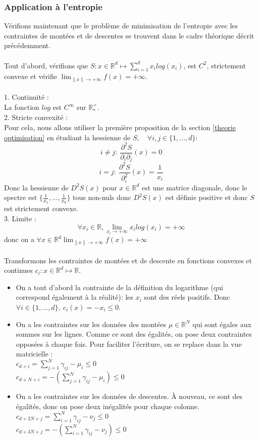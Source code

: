 \documentclass[12pt]{article}
\newcommand{\R}{\mathbb{R}}
\newcommand{\Rd}{\mathbb{R}^d}
\begin{document}
\subsubsection{Application à l'entropie}
Vérifions maintenant que le problème de minimisation de l'entropie avec les contraintes de montées et de descentes se trouvent dans le cadre théorique décrit précédemment.\\
\\
Tout d'abord, vérifions que $S : x \in \Rd \mapsto \sum_{i=1}^dx_ilog(x_i)$, est $C^2$, strictement convexe et vérifie $\lim_{\lVert x\lVert \to +\infty} f(x) = +\infty$.\\
\\
1. Continuité :\\
La fonction $log$ est $C^{\infty}$ sur $\R^+_*$.\\
2. Stricte convexité :\\
Pour cela, nous allons utiliser la première proposition de la section \ref{theorie optimisation} en étudiant la hessienne de $S, \quad \forall i, j \in \{ 1, ...,d\} :$
\[
i \neq j : \: \frac{\partial^2S}{\partial_i\partial_j}(x) = 0
\]
\[
i = j : \: \frac{\partial^2S}{\partial_i^2}(x) = \frac{1}{x_i}
\]
Donc la hessienne de $D^2S(x)$ pour $x \in \Rd$ est une matrice diagonale, donc le spectre est $\{\frac{1}{x_1},..., \frac{1}{x_d}\}$ tous non-nuls donc $D^2S(x)$ est définie positive et donc $S$ est strictement convexe. \\
3. Limite :\\
\[ \forall x_i \in \R, \lim_{x_i \to +\infty} x_ilog(x_i) = +\infty \]
donc  on a $\forall x \in \Rd \lim_{\lVert x\lVert \to +\infty} f(x) = +\infty$\\
\\
Transformons les contraintes de montées et de descente en fonctions convexes et continues $c_i : x \in \Rd \mapsto \R$.\\
\begin{itemize}
    \item On a tout d'abord la contrainte de la définition du logarithme (qui correspond également à la réalité): les $x_i$ sont des réels positifs. Donc $\forall i \in \{1,...,d\},\:c_i(x) = -x_i \leq 0$.\\
    \item On a les contraintes sur les données des montées $\mu \in \R^N$ qui sont égales aux sommes sur les lignes. Comme ce sont des égalités, on pose deux contraintes opposées à chaque fois. Pour faciliter l'écriture, on se replace dans la vue matricielle :\\
    $c_{d+i} = \sum^{N}_{j=1} \gamma_{ij} -\mu_i \leq 0$\\
    $c_{d+N+i} = -(\sum^{N}_{j=1} \gamma_{ij} -\mu_i) \leq 0$\\
    \item On a les contraintes sur les données de descentes. À nouveau, ce sont des égalités, donc on pose deux inégalités pour chaque colonne.\\
    $c_{d+2N+j} = \sum^{N}_{i=1} \gamma_{ij} -\nu_j \leq 0$\\
    $c_{d+3N+j} = -(\sum^{N}_{i=1} \gamma_{ij} -\nu_j) \leq 0$\\
\end{itemize}
\end{document}
